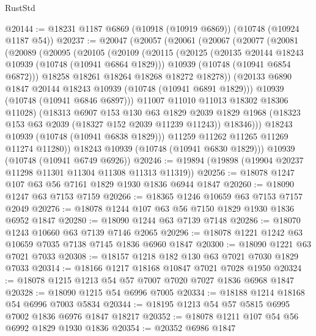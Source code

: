 \begin{lexlean}{RustStd}
\begin{coremodule}
{\begin{coremodule}
{{{{{@20144 := @18231 @1187 @6869 (@10918 (@10919 @6869)) (@10748 (@10924 @1187 @54))
@20237 := @20047
    (@20057
      (@20061
        (@20067
          (@20077
            (@20081
              (@20089
                (@20095
                  (@20105
                    (@20109
                      (@20115
                        (@20125
                          (@20135 @20144 @18243 @10939 (@10748 (@10941 @6864 @1829)))
                          @10939
                          (@10748 (@10941 @6854 @6872)))
                        @18258
                        @18261
                        @18264
                        @18268
                        @18272
                        @18278))
                    (@20133 @6890 @1847 @20144 @18243 @10939 (@10748 (@10941 @6891 @1829)))
                    @10939
                    (@10748 (@10941 @6846 @6897)))
                  @11007
                  @11010
                  @11013
                  @18302
                  @18306
                  @11028)
                (@18313
                  @6907
                  @153
                  @130
                  @63
                  @1829
                  @2039
                  @1829
                  @1968
                  (@18323 @153 @63 @2039 (@18327 @152 @2039 @11239 @11243))
                  @18346)))
            @18243
            @10939
            (@10748 (@10941 @6838 @1829)))
          @11259
          @11262
          @11265
          @11269
          @11274
          @11280))
      @18243
      @10939
      (@10748 (@10941 @6830 @1829)))
    @10939
    (@10748 (@10941 @6749 @6926))
@20246 := @19894 (@19898 (@19904 @20237 @11298 @11301 @11304 @11308 @11313 @11319))
@20256 := @18078 @1247 @107 @63 @56 @7161 @1829 @1930 @1836 @6944 @1847
@20260 := @18090 @1247 @63 @7153 @7159
@20266 := @18365 @1246 @10659 @63 @7153 @7157 @2049
@20276 := @18078 @1244 @107 @63 @56 @7150 @1829 @1930 @1836 @6952 @1847
@20280 := @18090 @1244 @63 @7139 @7148
@20286 := @18070 @1243 @10660 @63 @7139 @7146 @2065
@20296 := @18078 @1221 @1242 @63 @10659 @7035 @7138 @7145 @1836 @6960 @1847
@20300 := @18090 @1221 @63 @7021 @7033
@20308 := @18157 @1218 @182 @130 @63 @7021 @7030 @1829 @7033
@20314 := @18166 @1217 @18168 @10847 @7021 @7028 @1950
@20324 := @18078 @1215 @1213 @54 @57 @7007 @7020 @7027 @1836 @6968 @1847
@20328 := @18090 @1215 @54 @6996 @7005
@20334 := @18188 @1214 @18168 @54 @6996 @7003 @5834
@20344 := @18195 @1213 @54 @57 @5815 @6995 @7002 @1836 @6976 @1847 @18217
@20352 := @18078 @1211 @107 @54 @56 @6992 @1829 @1930 @1836
@20354 := @20352 @6986 @1847
}}}}}
\end{coremodule}}
\end{coremodule}
\end{lexlean}

